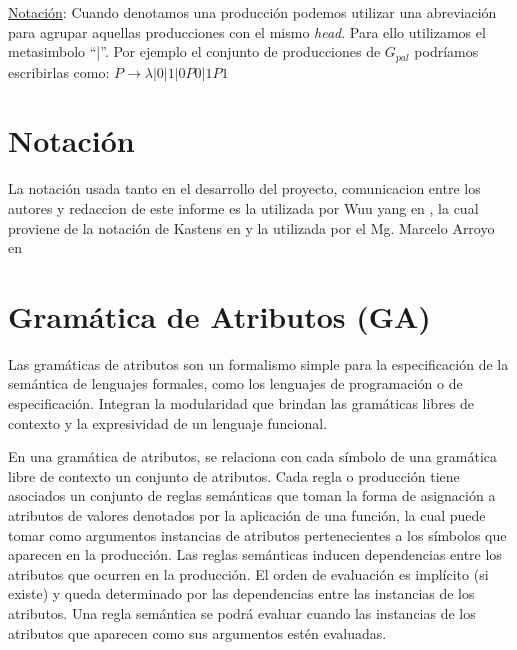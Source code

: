 \underline{Notación}: Cuando denotamos una producción podemos utilizar una abreviación para agrupar aquellas producciones con el mismo \textit{head}. Para ello utilizamos el metasimbolo ``|''. Por ejemplo el conjunto de producciones de $G_{pal}$ podríamos escribirlas como: $P \rightarrow \lambda | 0 | 1 | 0P0 | 1P1$ 

\section*{Notación}

La notación usada tanto en el desarrollo del proyecto, comunicacion entre los autores y redaccion de este informe es la utilizada por Wuu yang en \cite{wuu-yang1}, la cual proviene de la notación de Kastens en \cite{kastens} y la utilizada por el Mg. Marcelo Arroyo en \cite{tesismarcelo}

\section{Gramática de Atributos (GA)}

Las gramáticas de atributos son un formalismo simple para la especificación de la semántica de lenguajes formales, como los lenguajes de programación o de especificación. Integran la modularidad que brindan las gramáticas libres de contexto y la expresividad de un lenguaje funcional.

En una gramática de atributos, se relaciona con cada símbolo de una gramática libre de contexto un conjunto de atributos. Cada regla o producción tiene asociados un conjunto de reglas semánticas que toman la forma de asignación a atributos de valores denotados por la aplicación de una función, la cual puede tomar como argumentos instancias de atributos pertenecientes a los símbolos que aparecen en la producción.
Las reglas semánticas inducen dependencias entre los atributos que ocurren en la producción. El orden de evaluación es implícito (si existe) y queda determinado por las dependencias entre las instancias de los atributos.
Una regla semántica se podrá evaluar cuando las instancias de los atributos que aparecen como sus argumentos estén evaluadas. 

